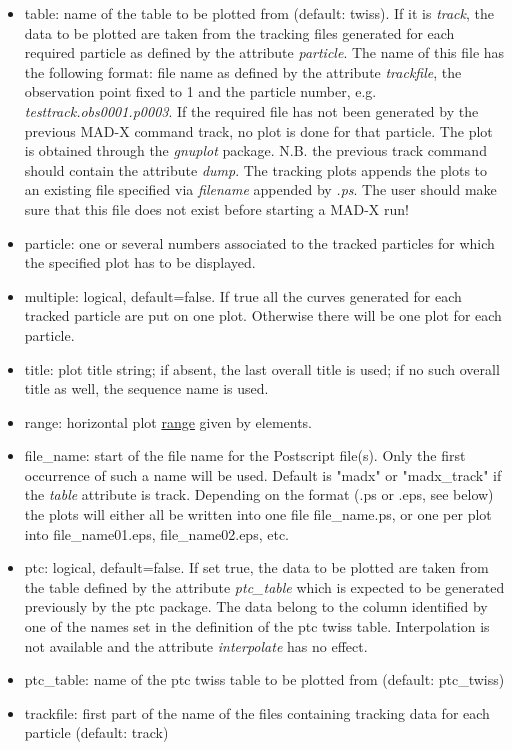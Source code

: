 \begin{itemize}
\begin{itemize}
	\item table: name of the table to be plotted from (default: twiss). If it is \textit{track}, the data to be plotted are taken from the tracking files generated for each required particle as defined by the attribute \textit{particle}. The name of this file has the following format: file name as defined by the attribute \textit{trackfile}, the observation point fixed to 1 and the particle number, e.g. \textit{testtrack.obs0001.p0003}.  If the required file has not been generated by the previous MAD-X command track, no plot is done for that particle.  The plot is obtained through the \textit{gnuplot} package.  N.B. the previous track command should contain the attribute \textit{dump}. The tracking plots appends the plots to an existing file specified via \textit{filename} appended by \textit{.ps}. The user should make sure that this file does not exist before starting a MAD-X run!
	\item particle: one or several numbers associated to the tracked particles for which the specified plot has to be displayed. 
	\item multiple: logical, default=false. If true all the curves generated for each tracked particle are put on one plot. Otherwise there will be one plot for each particle.  
	\item title: plot title string; if absent, the last overall title is used; if no such overall title as well, the sequence name is used.  
	\item range: horizontal plot \href{../Introduction/ranges.html}{range} given by elements. 
	\item file\_name: start of the file name for the Postscript file(s). Only the first occurrence of such a name will be used. Default is "madx" or "madx\_track" if the \textit{table} attribute is track.  Depending on the format (.ps or .eps, see below) the plots will either all be written into one file file\_name.ps, or one per plot into file\_name01.eps, file\_name02.eps, etc.  
	\item ptc: logical, default=false. If set true, the data to be plotted are taken from the table defined by the attribute \textit{ptc\_table} which is expected to be generated previously by the ptc package. The data belong to the column identified by one of the names set in the definition of the ptc twiss table. Interpolation is not available and the attribute \textit{interpolate} has no effect.  
	\item ptc\_table: name of the ptc twiss table to be plotted from (default: ptc\_twiss) 
	\item trackfile: first part of the name of the files containing tracking data for each particle (default: track) 
\end{itemize}



\end{itemize}

